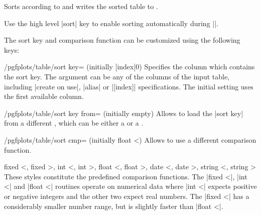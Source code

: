 \documentclass[a4paper]{ltxdoc}
\begin{document}
\begin{command}{\pgfplotstablesort{}}
    Sorts  according to 
    and writes the sorted table to .

    Use the high level |sort| key to enable sorting automatically during
    |\pgfplotstabletypeset|.
\begin{codeexample}[]
\pgfplotstablesort{}
\pgfplotstabletypeset[columns/c/.style={string type}]{\result}%
\end{codeexample}

    The sort key and comparison function can be customized using the following
    keys:

    \begin{key}{/pgfplots/table/sort key= (initially [index]0)}
        Specifies the column which contains the sort key. The argument
         can be any of the columns of the input table, including
        |create on use|, |alias| or |[index]| specifications. The
        initial setting uses the first available column.
    \end{key}

    \begin{key}{/pgfplots/table/sort key from= (initially empty)}
        Allows to load the |sort key| from a different , which can
        be either a  or a .
    \end{key}

    \begin{key}{/pgfplots/table/sort cmp= (initially float <)}
        Allows to use a different comparison function.

        \begin{pgfplotskeylist}{%
            fixed <,
            fixed >,
            int <,
            int >,
            float <,
            float >,
            date <,
            date >,
            string <,
            string >%
        }
            These styles constitute the predefined comparison functions. The
            |fixed <|, |int <| and |float <| routines operate on numerical data
            where |int <| expects positive or negative integers and the other
            two expect real numbers. The |fixed <| has a considerably smaller
            number range, but is slightly faster than |float <|.


\end{pgfplotskeylist}
\end{key}
\end{command}
\end{document}
